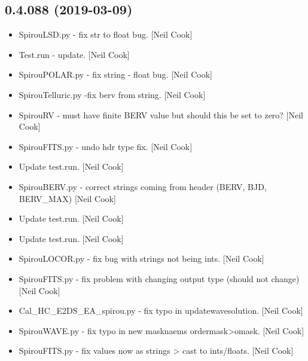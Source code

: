\documentclass[a4paper,10pt,english]{report}
\begin{document}
\subsection{0.4.088 (2019-03-09)}
\label{\detokenize{misc/changelog:id171}}\begin{itemize}
\item {} 
SpirouLSD.py - fix str to float bug. {[}Neil Cook{]}

\item {} 
Test.run - update. {[}Neil Cook{]}

\item {} 
SpirouPOLAR.py - fix string - float bug. {[}Neil Cook{]}

\item {} 
SpirouTelluric.py -fix berv from string. {[}Neil Cook{]}

\item {} 
SpirouRV - must have finite BERV value \textendash{} but should this be set to
zero? {[}Neil Cook{]}

\item {} 
SpirouFITS.py - undo hdr type fix. {[}Neil Cook{]}

\item {} 
Update test.run. {[}Neil Cook{]}

\item {} 
SpirouBERV.py - correct strings coming from header (BERV, BJD,
BERV\_MAX) {[}Neil Cook{]}

\item {} 
Update test.run. {[}Neil Cook{]}

\item {} 
Update test.run. {[}Neil Cook{]}

\item {} 
SpirouLOCOR.py - fix bug with strings not being ints. {[}Neil Cook{]}

\item {} 
SpirouFITS.py - fix problem with changing output type (should not
change) {[}Neil Cook{]}

\item {} 
Cal\_HC\_E2DS\_EA\_spirou.py - fix typo in updatewavesolution. {[}Neil Cook{]}

\item {} 
SpirouWAVE.py - fix typo in new masknaems ordermask\textendash{}\textgreater{}omask. {[}Neil
Cook{]}

\item {} 
SpirouFITS.py - fix values now as strings \textendash{}\textgreater{} cast to ints/floats.
{[}Neil Cook{]}


\end{itemize}
\end{document}
